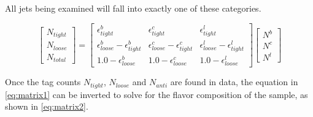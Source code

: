 All jets being examined will fall into exactly one of these categories.

        \begin{equation}
            \begin{bmatrix} \scriptstyle
            N_{tight} \\ \scriptstyle
            N_{loose} \\ \scriptstyle
            N_{total}
            \end{bmatrix}    
            = 
            \begin{bmatrix} \scriptstyle
                \epsilon^b_{tight} & \scriptstyle \epsilon^c_{tight} & \scriptstyle \epsilon^l_{tight} \\  \scriptstyle
                \epsilon^b_{loose} - \epsilon^b_{tight} & \scriptstyle \epsilon^c_{loose} - \epsilon^c_{tight} & \scriptstyle \epsilon^l_{loose} - \epsilon^l_{tight} \\      \scriptstyle
                1.0 - \epsilon^b_{loose} & \scriptstyle 1.0 - \epsilon^c_{loose} & \scriptstyle  1.0 - \epsilon^l_{loose}
            \end{bmatrix}
            \begin{bmatrix} \scriptstyle
                N^b \\ \scriptstyle
                N^c \\ \scriptstyle
                N^l
            \end{bmatrix}
        \label{eq:matrix1} 
        \end{equation} %

Once the tag counts $N_{tight}$, $N_{loose}$ and $N_{anti}$ are found in data, the equation in \ref{eq:matrix1} can be inverted to solve for the flavor composition of the sample, as shown in \ref{eq:matrix2}.


